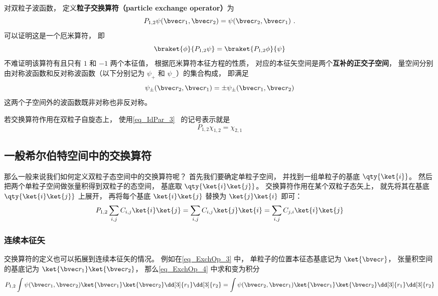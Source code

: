 
\begin{issues}
\issueTODO
\end{issues}


对双粒子波函数， 定义\textbf{粒子交换算符（particle exchange operator）}为
\begin{equation}\label{eq_ExchOp_3}
P_{1,2}\psi(\bvec r_1, \bvec r_2) = \psi(\bvec r_2, \bvec r_1)~.
\end{equation}
可以证明这是一个厄米算符， 即
\begin{equation}
\braket{\phi}{P_{1,2}\psi} = \braket{P_{1,2}\phi}{\psi}
\end{equation}
不难证明该算符有且只有 $1$ 和 $-1$ 两个本征值， 根据厄米算符本征方程的性质， 对应的本征矢空间是两个\textbf{互补的正交子空间}， 量空间分别由对称波函数和反对称波函数（以下分别记为 $\psi_+$ 和 $\psi_-$）的集合构成， 即满足
\begin{equation}
\psi_\pm(\bvec r_2, \bvec r_1) = \pm\psi_\pm(\bvec r_1, \bvec r_2)
\end{equation}
这两个子空间外的波函数既非对称也非反对称。

若交换算符作用在双粒子自旋态上， 使用\autoref{eq_IdPar_3}~ 的记号表示就是
\begin{equation}\label{eq_ExchOp_6}
P_{1,2}\chi_{1,2} = \chi_{2,1}
\end{equation}

\subsection{一般希尔伯特空间中的交换算符}
那么一般来说我们如何定义双粒子态空间中的交换算符呢？ 首先我们要确定单粒子空间， 并找到一组单粒子的基底 $\qty{\ket{i}}$。 然后把两个单粒子空间做张量积得到双粒子的态空间， 基底取 $\qty{\ket{i}\ket{j}}$。 交换算符作用在某个双粒子态矢上， 就先将其在基底 $\qty{\ket{i}\ket{j}}$ 上展开， 再将每个基底 $\ket{i}\ket{j}$ 替换为 $\ket{j}\ket{i}$ 即可：
\begin{equation}\label{eq_ExchOp_4}
P_{1,2} \sum_{i,j} C_{i,j} \ket{i}\ket{j} = \sum_{i,j} C_{i,j} \ket{j}\ket{i} = \sum_{i,j} C_{j,i} \ket{i}\ket{j}
\end{equation}

\subsubsection{连续本征矢}
交换算符的定义也可以拓展到连续本征矢的情况。 例如在\autoref{eq_ExchOp_3} 中， 单粒子的位置本征态基底记为 $\ket{\bvec r}$， 张量积空间的基底记为 $\ket{\bvec r_1}\ket{\bvec r_2}$， 那么\autoref{eq_ExchOp_4} 中求和变为积分
\begin{equation}
P_{1,2} \int \psi(\bvec r_1, \bvec r_2) \ket{\bvec r_1}\ket{\bvec r_2} \dd[3]{r_1} \dd[3]{r_2} = \int \psi(\bvec r_2, \bvec r_1) \ket{\bvec r_1}\ket{\bvec r_2} \dd[3]{r_1} \dd[3]{r_2}
\end{equation}

